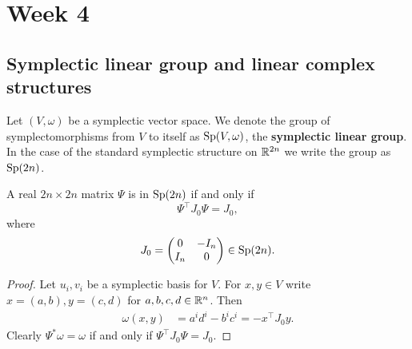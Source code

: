 \documentclass{amsart}
\begin{document}
\newpage

\section{Week 4}
\subsection{Symplectic linear group and linear complex structures}
%
%
\begin{definition}
    Let $(V,\omega)$ be a symplectic vector space. We denote the group of symplectomorphisms
    from $V$ to itself as $\operatorname{Sp}(V,\omega)$, the \textbf{symplectic linear group}. In the case
    of the standard symplectic structure on $\mathbb{R}^{2n}$ we write the group as $\operatorname{Sp}(2n)$.
\end{definition}

\begin{lemma}
    A real $2n\times 2n$ matrix $\Psi$ is in $\operatorname{Sp}(2n)$ if and only if
    \begin{equation*}
        \Psi^\top J_0\Psi = J_0,
    \end{equation*}
    where
    \begin{equation*}
        J_0=
        \begin{pmatrix}
            0 & -I_n\\
            I_n & 0
        \end{pmatrix}\in\operatorname{Sp}(2n).
    \end{equation*}
    \label{lem:matrixform}
\end{lemma}
\begin{proof}
    Let $u_i,v_i$ be a symplectic basis for $V$. For $x,y\in V$ write $x=(a,b),y=(c,d)$
    for $a,b,c,d\in\mathbb{R}^n$. Then
    \begin{align*}
        \omega(x,y) &= a^id^i - b^ic^i = -x^\top J_0y.
    \end{align*}
    Clearly $\Psi^*\omega=\omega$ if and only if $\Psi^\top J_0\Psi=J_0$.
\end{proof}
\end{document}

